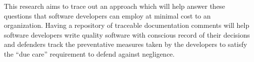 This research aims to trace out an approach which will help answer these
questions that software developers can employ at minimal cost to an 
organization. Having a repository of traceable documentation comments will help
software developers write quality software with conscious record of their 
decisions and defenders track the preventative measures taken by the developers
to satisfy the ``due care'' requirement to defend against negligence.
